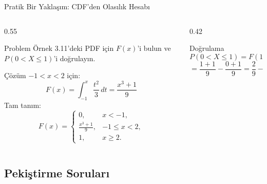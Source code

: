 ﻿\documentclass[light]{lutbeamer}
\begin{document}
\begin{frame}{Pratik Bir Yaklaşım: CDF'den Olasılık Hesabı}
\footnotesize
\begin{columns}[T]
  \begin{column}{0.55\textwidth}
    \begin{block}{Problem}
      Örnek 3.11'deki PDF için $F(x)$'i bulun ve $P(0 < X \le 1)$'i doğrulayın.
    \end{block}
    \begin{alertblock}{Çözüm}
      $-1 < x < 2$ için:
      \[
      F(x) = \int_{-1}^{x} \frac{t^2}{3}\,dt = \frac{x^3 + 1}{9}
      \]
      Tam tanım:
      \[
      F(x) =
      \begin{cases}
        0, & x < -1,\\
        \frac{x^3+1}{9}, & -1 \le x < 2,\\
        1, & x \ge 2.
      \end{cases}
      \]
    \end{alertblock}
  \end{column}
  \begin{column}{0.42\textwidth}
    \begin{block}{Doğrulama}
      \[
      P(0 < X \le 1) = F(1) - F(0)
      \]
      \[
      = \frac{1+1}{9} - \frac{0+1}{9} = \frac{2}{9} - \frac{1}{9} = \frac{1}{9} \;\checkmark
      \]
    \end{block}
    \centering
  \end{column}
\end{columns}
\end{frame}

\subsection{Pekiştirme Soruları}
\end{document}
